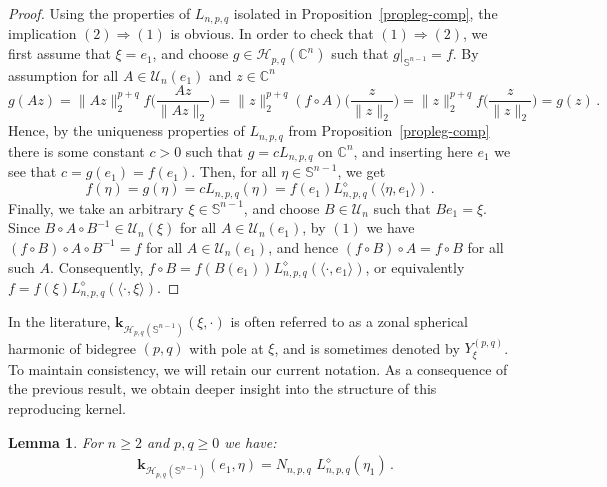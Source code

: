 \documentclass[12pt]{amsart}
\numberwithin{subsection}{section}
\newtheorem{lemma}[theorem]{Lemma}
\theoremstyle{definition}
\theoremstyle{remark}
\begin{document}
\begin{proof}
Using the properties of  $L_{n,p,q} $ isolated in Proposition~\ref{propleg-comp}, the implication  $(2)\Rightarrow(1) $ is obvious.
In order to  check that   $(1)\Rightarrow(2) $, we first assume that  $\xi = e_1 $, and  choose
$g \in \mathcal{H}_{p,q}(\mathbb{C}^n) $ such that  $g|_{\mathbb{S}^{n-1}} = f $. By assumption for all  $A \in \mathcal{U}_n(e_1) $ and  $z \in \mathbb{C}^n $
\[
g(Az) = \|Az\|^{p+q}_2 f \Big(\frac{Az}{\|Az\|_2}\Big)
=
\|z\|^{p+q}_2 (f\circ A) \Big(\frac{z}{\|z\|_2}\Big)
=
\|z\|^{p+q}_2 f \Big(\frac{z}{\|z\|_2}\Big)
= g(z)\,.
\]
Hence, by the uniqueness properties of   $L_{n,p,q} $ from Proposition~\ref{propleg-comp} there is some constant  $c >0 $ such that
$g = c L_{n,p,q} $ on  $\mathbb{C}^n $, and inserting here  $e_1 $ we see that  $c = g(e_1)=f(e_1) $. Then, for all  $\eta \in \mathbb{S}^{n-1} $,
we get
\begin{equation*}
f(\eta) = g( \eta) = c L_{n,p,q}(\eta) = f(e_1) L^{\diamond}_{n,p,q}(\langle\eta, e_1\rangle)\,.
\end{equation*}
Finally, we take an arbitrary  $\xi \in \mathbb{S}^{n-1} $,  and choose   $B \in \mathcal{U}_n $ such that
$Be_1 = \xi $.  Since  $B \circ A \circ B^{-1} \in \mathcal{U}_n(\xi) $ for all
$A \in \mathcal{U}_n(e_1) $, by  $(1) $ we have  $(f \circ B) \circ A \circ B^{-1} = f $ for all
$A \in \mathcal{U}_n(e_1) $, and hence  $(f \circ B) \circ A = f \circ B $ for all such  $A $. Consequently,
$f \circ B = f (B(e_1)) L^{\diamond}_{n,p,q}(\langle\pmb{\cdot},e_1\rangle) $,  or equivalently
$f = f(\xi) L^{\diamond}_{n,p,q}(\langle\pmb{\cdot},\xi \rangle) $.
\end{proof}


\smallskip

\smallskip
In the literature, $\mathbf{k}_{\mathcal{H}_{p,q}(\mathbb{S}^{n-1})}(\xi, \cdot)$ is often referred to as a zonal spherical harmonic of
bidegree $(p,q)$ with pole at $\xi$, and is sometimes denoted by $Y^{(p,q)}_\xi$. To maintain consistency, we will retain our current
notation. As a consequence of the previous result, we obtain deeper insight into the structure of this reproducing kernel.


\begin{lemma} \label{lemma: repro}
For $n \geq 2 $ and  $p,q \geq 0 $ we have:
\begin{align*}
&
\mathbf{k}_{\mathcal{H}_{p,q}(\mathbb{S}^{n-1})}(e_1, \eta) = N_{n,p,q}\,\,L^{\diamond}_{n,p,q}(\eta_1)\,.
\end{align*}
\end{lemma}
\end{document}
